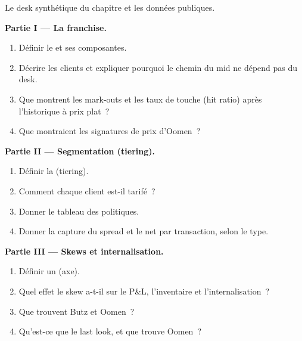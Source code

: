 \begin{problem}\label{pb:s2:flow-market-making-at-a-bank:1}
Le desk synthétique du chapitre et les données publiques.

\medskip\noindent\textbf{Partie I --- La franchise.}
\begin{enumerate}
\item Définir le  et ses composantes.
\item Décrire les clients et expliquer pourquoi le chemin du mid ne dépend pas du desk.
\item Que montrent les mark-outs et les taux de touche (hit ratio) après l'historique à prix plat~?
\item Que montraient les signatures de prix d'Oomen~?
\end{enumerate}

\medskip\noindent\textbf{Partie II --- Segmentation (tiering).}
\begin{enumerate}[resume]
\item Définir la  (tiering).
\item Comment chaque client est-il tarifé~?
\item Donner le tableau des politiques.
\item Donner la capture du spread et le net par transaction, selon le type.
\end{enumerate}

\medskip\noindent\textbf{Partie III --- Skews et internalisation.}
\begin{enumerate}[resume]
\item Définir un  (axe).
\item Quel effet le skew a-t-il sur le P\&L, l'inventaire et l'internalisation~?
\item Que trouvent Butz et Oomen~?
\item Qu'est-ce que le last look, et que trouve Oomen~?
\end{enumerate}


\end{problem}
